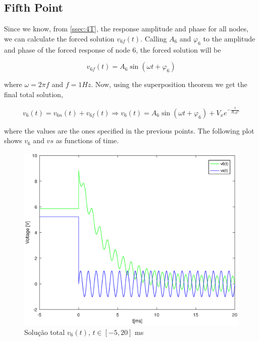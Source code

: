 \vspace{5mm}

\begin{table}[h!]
\centering
\begin{tabularx}{1.0\textwidth} {
  | >{\raggedright\arraybackslash}X
  | >{\centering\arraybackslash}X
  | >{\centering\arraybackslash}X
  | >{\raggedleft\arraybackslash}X | }
 \hline

\end{tabularx}
\end{table}

\vspace{5mm}


\subsection{Fifth Point}
\label{ssec:5T}

\par Since we know, from \ref{ssec:4T}, the response amplitude and phase for all nodes, we can calculate the forced solution $v_{6f}(t)$. Calling $A_6$ and $\varphi _6$ to the amplitude and phase of the forced response of node 6, the forced solution will be 

\begin{equation}
  v_{6f}(t) = A_6 \sin(\omega t + \varphi _6)
  \label{eq:fsol}
\end{equation}

where $\omega=2\pi f$ and $f=1Hz$. Now, using the superposition theorem we get the final total solution,

\begin{equation}
  v_{6}(t) = v_{6n}(t)+v_{6f}(t) \Rightarrow v_{6}(t) = A_6 \sin(\omega t + \varphi _6) + V_x e^{-\frac{t}{R_{eq}C}}
  \label{eq:gensol}
\end{equation}

where the values are the ones specified in the previous points. The following plot shows $v_6$ and $vs$ as functions of time.

\begin{figure}[h!] \centering
\includegraphics[width=0.6\linewidth]{general_solution.eps}
\caption{Solução total $v_{6}(t)$, $t\in[-5,20]$ ms}
\label{fig:gensol}
\end{figure}

